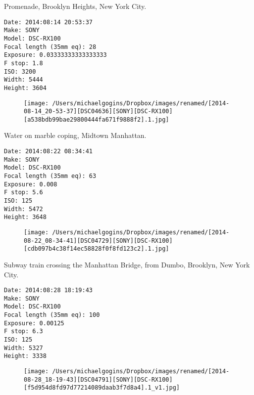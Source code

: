 \documentclass[11pt,letter,DIV=14,paper=landscape]{scrbook}
\begin{document}
\clearpage
\noindent Promenade, Brooklyn Heights, New York City.
\noindent
\begin{lstlisting}
Date: 2014:08:14 20:53:37
Make: SONY
Model: DSC-RX100
Focal length (35mm eq): 28
Exposure: 0.03333333333333333
F stop: 1.8
ISO: 3200
Width: 5444
Height: 3604
\end{lstlisting}
\clearpage

\begin{figure}
\texttt{[image: /Users/michaelgogins/Dropbox/images/renamed/[2014-08-14\_20-53-37][DSC04636][SONY][DSC-RX100][a538bdb99bae29800444fa671f9888f2].1.jpg]}
\end{figure}
    
\clearpage
\noindent Water on marble coping, Midtown Manhattan.
\noindent
\begin{lstlisting}
Date: 2014:08:22 08:34:41
Make: SONY
Model: DSC-RX100
Focal length (35mm eq): 63
Exposure: 0.008
F stop: 5.6
ISO: 125
Width: 5472
Height: 3648
\end{lstlisting}
\clearpage

\begin{figure}
\texttt{[image: /Users/michaelgogins/Dropbox/images/renamed/[2014-08-22\_08-34-41][DSC04729][SONY][DSC-RX100][cdb097b4c38f14ec58828f0f8fd123c2].1.jpg]}
\end{figure}
    
\clearpage
\noindent Subway train crossing the Manhattan Bridge, from Dumbo, Brooklyn, New York City.
\noindent
\begin{lstlisting}
Date: 2014:08:28 18:19:43
Make: SONY
Model: DSC-RX100
Focal length (35mm eq): 100
Exposure: 0.00125
F stop: 6.3
ISO: 125
Width: 5327
Height: 3338
\end{lstlisting}
\clearpage

\begin{figure}
\texttt{[image: /Users/michaelgogins/Dropbox/images/renamed/[2014-08-28\_18-19-43][DSC04791][SONY][DSC-RX100][f5d954d8fd97d77214089daab3f7d8a4].1\_v1.jpg]}
\end{figure}
    
\end{document}
